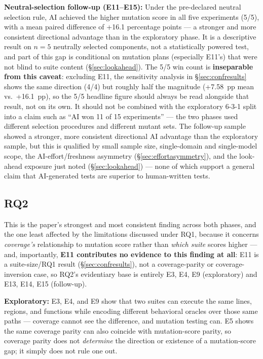 \documentclass[10pt,conference]{IEEEtran}
\begin{document}
\textbf{Neutral-selection follow-up (E11--E15):} Under the pre-declared neutral selection rule, AI achieved the higher mutation score in all five experiments (5/5), with a mean paired difference of +16.1 percentage points — a stronger and more consistent directional advantage than in the exploratory phase. It is a descriptive result on $n=5$ neutrally selected components, not a statistically powered test, and part of this gap is conditional on mutation plans (especially E11's) that were not blind to suite content (\S\ref{sec:lookahead}). The 5/5 win count is \textbf{inseparable from this caveat}: excluding E11, the sensitivity analysis in \S\ref{sec:confresults} shows the same direction (4/4) but roughly half the magnitude (+7.58~pp mean vs.\ +16.1~pp), so the 5/5 headline figure should always be read alongside that result, not on its own. It should not be combined with the exploratory 6-3-1 split into a claim such as ``AI won 11 of 15 experiments'' — the two phases used different selection procedures and different mutant sets. The follow-up sample showed a stronger, more consistent directional AI advantage than the exploratory sample, but this is qualified by small sample size, single-domain and single-model scope, the AI-effort/freshness asymmetry (\S\ref{sec:effortasymmetry}), and the look-ahead exposure just noted (\S\ref{sec:lookahead}) — none of which support a general claim that AI-generated tests are superior to human-written tests.

\subsection{RQ2}
This is the paper's strongest and most consistent finding across both phases, and the one least affected by the limitations discussed under RQ1, because it concerns \emph{coverage's} relationship to mutation score rather than \emph{which suite} scores higher — and, importantly, \textbf{E11 contributes no evidence to this finding at all}: E11 is a suite-size/RQ1 result (\S\ref{sec:confresults}), not a coverage-parity or coverage-inversion case, so RQ2's evidentiary base is entirely E3, E4, E9 (exploratory) and E13, E14, E15 (follow-up).

\textbf{Exploratory:} E3, E4, and E9 show that two suites can execute the same lines, regions, and functions while encoding different behavioral oracles over those same paths — coverage cannot see the difference, and mutation testing can. E5 shows the same coverage parity can also coincide with mutation-score parity, so coverage parity does not \emph{determine} the direction or existence of a mutation-score gap; it simply does not rule one out.
\end{document}
